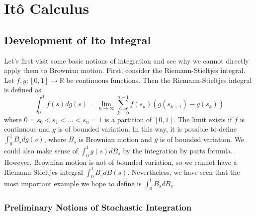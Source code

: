 \section{Itô Calculus}

\subsection{Development of Ito Integral}

Let's first visit some basic notions of integration and see why we cannot directly apply them to Brownian motion. First, consider the Riemann-Stieltjes integral. Let $f, g: [0,1] \to \mathbb{R}$ be continuous functions. Then the Riemann-Stieltjes integral is defined as
\[
	\int _0^1 f(s) dg(s) = \lim_{n \to \infty} \sum_{k=0}^{n-1} f(s_k) \left( g(s_{k+1}) - g(s_k) \right)
\]
where $0 = s_0 < s_1 < \ldots < s_n = 1$ is a partition of $[0,1]$. The limit exists if $f$ is continuous and $g$ is of bounded variation. In this way, it is possible to define $\int _0^1 B_s dg(s)$, where $B_s$ is Brownian motion and $g$ is of bounded variation. We could also make sense of $\int _0^1 g(s) dB_s$ by the integration by parts formula.
However, Brownian motion is not of bounded variation, so we cannot have a Riemann-Stieltjes integral $\int _0^1 B_s dB(s)$. Nevertheless, we have seen that the most important example we hope to define is $\int _0^t B_s dB_s$. 

\subsubsection{Preliminary Notions of Stochastic Integration}

